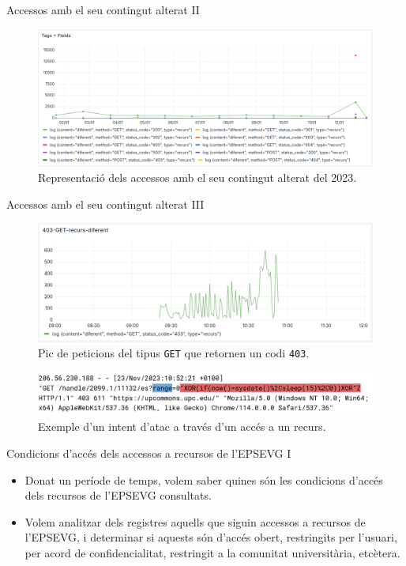 \begin{frame}{Accessos amb el seu contingut alterat II}
    \begin{figure}
        \includegraphics[width=\textwidth]{figures/possible-attacks}
        \caption{Representació dels accessos amb el seu contingut alterat del 2023.}\label{fig:use-case-2}

    \end{figure}
\end{frame}

\begin{frame}{Accessos amb el seu contingut alterat III}
    \begin{figure}
        \includegraphics[width=\textwidth]{figures/possible-attacks-403}
        \caption{Pic de peticions del tipus \texttt{GET} que retornen un codi \texttt{403}.}\label{fig:use-case-2-1}
    \end{figure}
    \begin{figure}
        \includegraphics[width=\textwidth]{figures/log-attack}
        \caption{Exemple d'un intent d'atac a través d'un accés a un recurs.}\label{fig:use-case-2-2}
    \end{figure}
\end{frame}

\begin{frame}{Condicions d'accés dels accessos a recursos de l'EPSEVG I}
    \begin{itemize}
        \item Donat un període de temps, volem saber quines són les condicions d'accés dels recursos de l'EPSEVG consultats.
        \item Volem analitzar dels registres aquells que siguin accessos a recursos de l'EPSEVG, i determinar si aquests són d'accés obert, restringits per l'usuari, per acord de confidencialitat, restringit a la comunitat universitària, etcètera.
    \end{itemize}
\end{frame}

